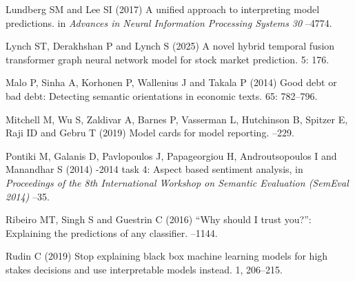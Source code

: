 \documentclass{aims}
\numberwithin{equation}{section}
\begin{document}
\begin{thebibliography}{}
\newblock Lundberg SM and Lee SI (2017)
\newblock A unified approach to interpreting model predictions.
\newblock in {\em Advances in Neural Information Processing Systems 30}
--4774.  

\newblock Lynch ST, Derakhshan P and Lynch S (2025)
\newblock A novel hybrid temporal fusion transformer graph neural network model for stock market prediction.
 5: 176.
\newblock {}

\newblock Malo P, Sinha A, Korhonen P, Wallenius J and Takala P (2014)
\newblock Good debt or bad debt: Detecting semantic orientations in economic
  texts.
 65: 782--796. 

\newblock Mitchell M, Wu S, Zaldivar A, Barnes P, Vasserman L,
  Hutchinson B, Spitzer E, Raji ID and Gebru T (2019)
\newblock Model cards for model reporting.
--229. 

\newblock Pontiki M,  Galanis D, Pavlopoulos J, Papageorgiou H,
  Androutsopoulos I and Manandhar S (2014)
-2014 task 4: Aspect based sentiment analysis,
\newblock in {\em Proceedings of the 8th International Workshop on Semantic
  Evaluation (SemEval 2014)} 
--35. 

\newblock Ribeiro MT, Singh S and Guestrin C (2016)
\newblock ``Why should {I} trust you?'': Explaining the predictions of any
  classifier.
--1144. 

\newblock Rudin C (2019)
\newblock Stop explaining black box machine learning models for high stakes decisions and use interpretable models instead.
 1, 206--215. 


\end{thebibliography}
\end{document}
